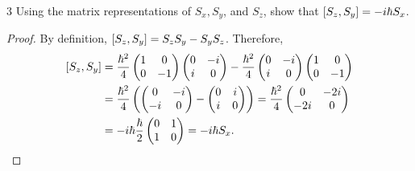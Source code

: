 \documentclass[11pt]{article}
\begin{document}
\begin{problem}{3}
  Using the matrix representations of \( S_x, S_y \), and \( S_z \), show that \( \comm{S_z}{S_y} = -i\hbar S_x \).
\end{problem}
\begin{proof}
  By definition, \( \comm{S_z}{S_y} = S_zS_y - S_yS_z \).
  Therefore,
  \begin{equation}
  \label{eq:8}
  \begin{aligned}
    \comm{S_z}{S_y} &= \frac{\hbar^2}{4} \begin{pmatrix}
1  & 0 \\
0  & -1
 \end{pmatrix} \begin{pmatrix}
0  & -i \\
i  & 0
 \end{pmatrix} - \frac{\hbar^2}{4} \begin{pmatrix}
0  & -i \\
i  & 0
 \end{pmatrix} \begin{pmatrix}
1  & 0 \\
0  & -1
 \end{pmatrix} \\
    &= \frac{\hbar^2}{4} \left( \begin{pmatrix}
0   & -i \\
-i  & 0
 \end{pmatrix} - \begin{pmatrix}
0  & i \\
i  & 0
 \end{pmatrix} \right) = \frac{\hbar^2}{4} \begin{pmatrix}
0    & -2i \\
-2i  & 0
 \end{pmatrix} \\
    &= -i \hbar \frac{\hbar}{2} \begin{pmatrix}
0  & 1 \\
1  & 0
 \end{pmatrix} = -i \hbar S_x.
  \end{aligned}
  \end{equation}
\end{proof}
\end{document}
